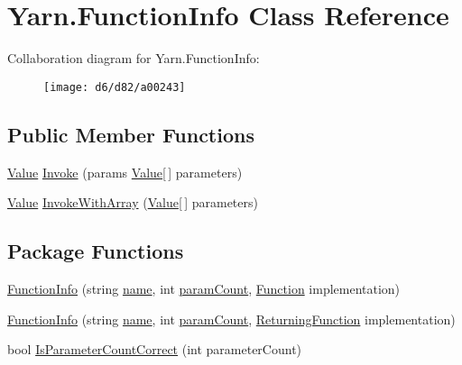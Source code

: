 \hypertarget{a00041}{\section{Yarn.\-Function\-Info Class Reference}
\label{a00041}
}


Collaboration diagram for Yarn.\-Function\-Info\-:
\nopagebreak
\begin{figure}[H]
\begin{center}
\leavevmode
\texttt{[image: d6/d82/a00243]}
\end{center}
\end{figure}
\subsection*{Public Member Functions}
\begin{DoxyCompactItemize}
\item 
\hyperlink{a00086}{Value} \hyperlink{a00041_ab400ac66785d7df2e3fc0f3ce3796044}{Invoke} (params \hyperlink{a00086}{Value}\mbox{[}$\,$\mbox{]} parameters)
\item 
\hyperlink{a00086}{Value} \hyperlink{a00041_a3ce11058d35232907a738de4bb094c67}{Invoke\-With\-Array} (\hyperlink{a00086}{Value}\mbox{[}$\,$\mbox{]} parameters)
\end{DoxyCompactItemize}
\subsection*{Package Functions}
\begin{DoxyCompactItemize}
\item 
\hyperlink{a00041_a93457cd0e838cb2ef59cc2a3a46ce758}{Function\-Info} (string \hyperlink{a00041_adb38e83e3c1597b553aeff14bef5bfcb}{name}, int \hyperlink{a00041_aa8527de9e4f153b05164ccaf167c3186}{param\-Count}, \hyperlink{a00026_ae0be2e5cf13d5779816102439e61ff1a}{Function} implementation)
\item 
\hyperlink{a00041_a41d97c09da25caede70cb734d18113b9}{Function\-Info} (string \hyperlink{a00041_adb38e83e3c1597b553aeff14bef5bfcb}{name}, int \hyperlink{a00041_aa8527de9e4f153b05164ccaf167c3186}{param\-Count}, \hyperlink{a00026_a5177bf74fbfe7303fac9d8236c2e514b}{Returning\-Function} implementation)
\item 
bool \hyperlink{a00041_a1ed09ff8aafa230a0d2bbc23cd6cd763}{Is\-Parameter\-Count\-Correct} (int parameter\-Count)
\end{DoxyCompactItemize}

